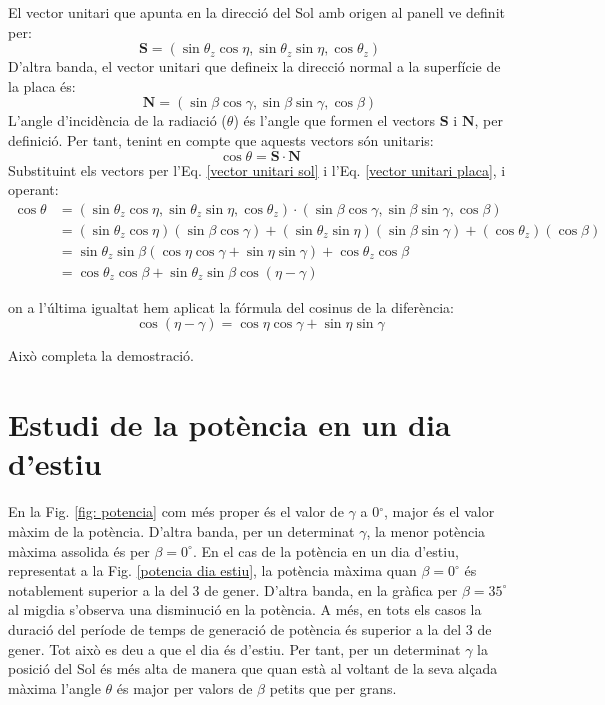 \documentclass[11pt]{article}
\begin{document}
El vector unitari que apunta en la direcció del Sol amb origen al panell ve definit per:
\begin{equation}
    \mathbf{S} = (\sin \theta_z \cos \eta, \sin \theta_z \sin \eta, \cos \theta_z)
    \label{vector unitari sol}
\end{equation}
D'altra banda, el vector unitari que defineix la direcció normal a la superfície de la placa és:
\begin{equation}
       \mathbf{N} = (\sin \beta \cos \gamma, \sin \beta \sin \gamma, \cos \beta)
       \label{vector unitari placa}
\end{equation}
L'angle d'incidència de la radiació (\(\theta\)) és l'angle que formen el vectors \(\mathbf{S}\) i \(\mathbf{N}\), per definició. Per tant, tenint en compte que aquests vectors són unitaris:
\begin{equation}
    \cos \theta = \mathbf{S} \cdot \mathbf{N}
\end{equation}
Substituint els vectors per l'Eq. \eqref{vector unitari sol} i l'Eq. \eqref{vector unitari placa}, i operant:
\begin{align*}
    \cos \theta &= (\sin \theta_z \cos \eta, \sin \theta_z \sin \eta, \cos \theta_z) \cdot (\sin \beta \cos \gamma, \sin \beta \sin \gamma, \cos \beta) \\
    &= (\sin \theta_z \cos \eta)(\sin \beta \cos \gamma) + (\sin \theta_z \sin \eta)(\sin \beta \sin \gamma) + (\cos \theta_z)(\cos \beta) \\
    &= \sin \theta_z \sin \beta (\cos \eta \cos \gamma + \sin \eta \sin \gamma) + \cos \theta_z \cos \beta \\
    &= \cos \theta_z \cos \beta + \sin \theta_z \sin \beta \cos (\eta - \gamma)
\end{align*}

on a l'última igualtat hem aplicat la fórmula del cosinus de la diferència:
\[
\cos (\eta - \gamma) = \cos \eta \cos \gamma + \sin \eta \sin \gamma
\]

Això completa la demostració.


\section{Estudi de la potència en un dia d'estiu}
\label{sec: dia estiu potencia}
En la Fig. \ref{fig: potencia} com més proper és el valor de $\gamma$ a 0$^{\circ}$, major és el valor màxim de la potència. D'altra banda, per un determinat $\gamma$, la menor potència màxima assolida és per $\beta=0^{\circ}$. En el cas de la potència en un dia d'estiu, representat a la Fig. \ref{potencia dia estiu}, la potència màxima quan $\beta=0^{\circ}$ és notablement superior a la del 3 de gener. D'altra banda, en la gràfica per $\beta=35^{\circ}$ al migdia s'observa una disminució en la potència. A més, en tots els casos la duració del període de temps de generació de potència és superior a la del 3 de gener. Tot això es deu a que el dia és d'estiu. Per tant, per un determinat $\gamma$ la posició del Sol és més alta de manera que quan està al voltant de la seva alçada màxima l’angle $\theta$ és major per valors de $\beta$ petits que per grans.
\end{document}
